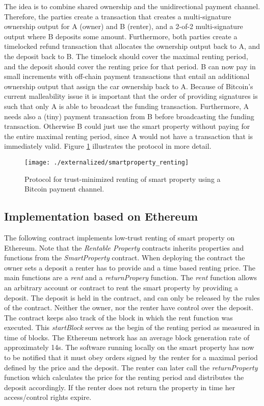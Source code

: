 {The idea is to combine shared ownership and the unidirectional payment channel. Therefore, the parties create a transaction that creates a multi-signature ownership output for A (owner) and B (renter), and a 2-of-2 multi-signature output where B deposits some amount. Furthermore, both parties create a timelocked refund transaction that allocates the ownership output back to A, and the deposit back to B. The timelock should cover the maximal renting period, and the deposit should cover the renting price for that period. B can now pay in small increments with off-chain payment transactions that entail an additional ownership output that assign the car ownership back to A. Because of Bitcoin's current malleability issue it is important that the order of providing signatures is such that only A is able to broadcast the funding transaction. Furthermore, A needs also a (tiny) payment transaction from B before broadcasting the funding transaction. Otherwise B could just use the smart property without paying for the entire maximal renting period, since A would not have a transaction that is immediately valid. Figure \ref{fig:smartproperty_renting} illustrates the protocol in more detail.

\begin{figure}[!t]
    \centering
    \texttt{[image: ./externalized/smartproperty\_renting]}
    \caption{Protocol for trust-minimized renting of smart property using a Bitcoin payment channel.}
    \label{fig:smartproperty_renting}
  \end{figure}

\subsection{Implementation based on Ethereum}


The following contract implements low-trust renting of smart property on Ethereum. Note that the \emph{Rentable Property} contracts inherits properties and functions from the \emph{SmartProperty} contract. When deploying the contract the owner sets a deposit a renter has to provide and a time based renting price. The main functions are a \emph{rent} and a \emph{returnPropery} function. The \emph{rent} function allows an arbitrary account or contract to rent the smart property by providing a deposit. The deposit is held in the contract, and can only be released by the rules of the contract. Neither the owner, nor the renter have control over the deposit. The contract keeps also track of the block in which the rent function was executed. This \emph{startBlock} serves as the begin of the renting period as measured in time of blocks. The Ethereum network has an average block generation rate of approximately 14s. 
The software running locally on the smart property has now to be notified that it must obey orders signed by the renter for a maximal period defined by the price and the deposit. 
The renter can later call the \emph{returnProperty} function which calculates the price for the renting period and distributes the deposit accordingly. If the renter does not return the property in time her access/control rights expire. 

}
